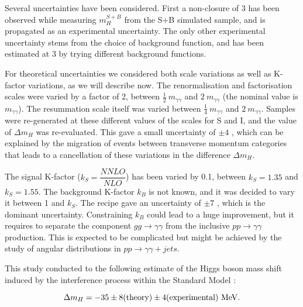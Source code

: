 Several uncertainties have been considered. First a non-closure of 3 \UMeV has been observed while measuring $m_H^{S+B}$ from the S+B simulated sample, and is propagated as an experimental uncertainty. The only other experimental uncertainty stems from the choice of background function, and has been estimated at 3 \UMeV by trying different background functions.

For theoretical uncertainties we considered both scale variations as well as K-factor variations, as we will describe now.
The renormalisation  and factorisation scales were varied by a factor of 2, between $\frac{1}{2}~m_{\gamma\gamma}$ and $2~m_{\gamma\gamma}$ (the nominal value is $m_{\gamma\gamma}$). The resummation scale itself was varied between $\frac{1}{4}~m_{\gamma\gamma}$ and $2~m_{\gamma\gamma}$. Samples were re-generated at these different values of the scales for S and I, and the value of $\Delta m_H$ was re-evaluated. This gave a small uncertainty of $\pm 4$ \UMeV, which can be explained by the migration of events between transverse momentum categories that leads to a cancellation of these variations in the difference $\Delta m_H$.

The signal K-factor ($k_S = \dfrac{NNLO}{NLO}$) has been varied by 0.1, between $k_S = 1.35$ and $k_S = 1.55$. The background K-factor $k_B$ is not known, and it was decided to vary it between 1 and $k_S$. The recipe gave an uncertainty of $\pm 7$ \UMeV, which is the dominant uncertainty. Constraining $k_B$ could lead to a huge improvement, but it requires to separate the component $gg \rightarrow \gamma\gamma$ from the inclusive $pp \rightarrow \gamma\gamma$ production. This is expected to be complicated but might be achieved by the study of angular distributions in $pp \rightarrow \gamma\gamma+jets$.

This study conducted to the following estimate of the Higgs boson mass shift induced by the interference process within the Standard Model :

\begin{equation}
    \Delta m_H = -35 \pm 8 {\rm{(theory)}} \pm 4 {\rm{(experimental) \ensuremath{~\text{MeV}}}}.
\end{equation}

